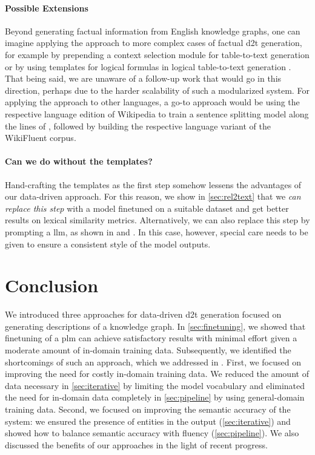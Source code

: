 \paragraph{Possible Extensions} Beyond generating factual information from English knowledge graphs, one can imagine applying the approach to more complex cases of factual \ac{d2t} generation, for example by prepending a context selection module for table-to-text generation \cite{parikhToTToControlledTableToText2020,chengHiTabHierarchicalTable2021} or by using templates for logical formulas in logical table-to-text generation \cite{chenLogicalNaturalLanguage2020,chenLogic2TextHighFidelityNatural2020}. That being said, we are unaware of a follow-up work that would go in this direction, perhaps due to the harder scalability of such a modularized system. For applying the approach to other languages, a go-to approach would be using the respective language edition of Wikipedia to train a sentence splitting model along the lines of \citet{botha-etal-2018-learning}, followed by building the respective language variant of the WikiFluent corpus.


\paragraph{Can we do without the templates?} Hand-crafting the templates as the first step somehow lessens the advantages of our data-driven approach. For this reason, we show in \autoref{sec:rel2text} that we \emph{can replace this step} with a model finetuned on a suitable dataset and get better results on lexical similarity metrics. Alternatively, we can also replace this step by prompting a \ac{llm}, as shown in \citet{xiangASDOTAnyShotDatatoText2022} and \citet{sahaMURMURModularMultiStep2022}. In this case, however, special care needs to be given to ensure a consistent style of the model outputs.



\section{Conclusion}
We introduced three approaches for data-driven \ac{d2t} generation focused on generating descriptions of a knowledge graph. In \autoref{sec:finetuning}, we showed that finetuning of a \ac{plm} can achieve satisfactory results with minimal effort given a moderate amount of in-domain training data. Subsequently, we identified the shortcomings of such an approach, which we addressed in . First, we focused on improving the need for costly in-domain training data. We reduced the amount of data necessary in \autoref{sec:iterative} by limiting the model vocabulary and eliminated the need for in-domain data completely in \autoref{sec:pipeline} by using general-domain training data. Second, we focused on improving the semantic accuracy of the system: we ensured the presence of entities in the output (\autoref{sec:iterative}) and showed how to balance semantic accuracy with fluency (\autoref{sec:pipeline}). We also discussed the benefits of our approaches in the light of recent progress.